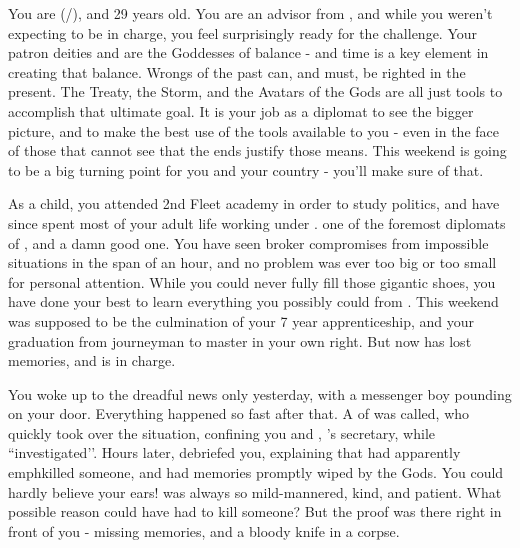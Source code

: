 \documentclass[char]{GL2020}
\begin{document}
\name{\cJuniorStatesman{}}

You are \cJuniorStatesman{\full} (\cJuniorStatesman{\they}/\cJuniorStatesman{\them}), and 29 years old. You are an advisor from \pShip{}, and while you weren’t expecting to be in charge, you feel surprisingly ready for the challenge. Your patron deities \cEbb{} and \cFlow{} are the Goddesses of balance - and time is a key element in creating that balance. Wrongs of the past can, and must, be righted in the present. The Treaty, the Storm, and the Avatars of the Gods are all just tools to accomplish that ultimate goal. It is your job as a diplomat to see the bigger picture, and to make the best use of the tools available to you - even in the face of those that cannot see that the ends justify those means. This weekend is going to be a big turning point for you and your country - you’ll make sure of that.

As a child, you attended 2nd Fleet academy in order to study politics, and have since spent most of your adult life working under \cHeadDiplomat{}. \cHeadDiplomat{\Theyare} one of the foremost diplomats of \pShip{}, and a damn good one. You have seen \cHeadDiplomat{\them} broker compromises from impossible situations in the span of an hour, and no problem was ever too big or too small for \cHeadDiplomat{\their} personal attention. While you could never fully fill those gigantic shoes, you have done your best to learn everything you possibly could from \cHeadDiplomat{\them}. This weekend was supposed to  be the culmination of your 7 year apprenticeship, and your graduation from journeyman to master in your own right. But now \cHeadDiplomat{} has lost  memories, and \cEbbPriest{} is in charge. 

You woke up to the dreadful news only yesterday, with a messenger boy pounding on your door. Everything happened so fast after that. A \cEbbPriest{\cleric} of \cEbb{} was called, who quickly took over the situation, confining you and \cChupLeader{}, \cHeadDiplomat{}’s secretary, while \cEbbPriest{\they} ``investigated’’. Hours later, \cEbbPriest{} debriefed you, explaining that \cHeadDiplomat{} had apparently emph{killed someone}, and had \cHeadDiplomat{\their} memories promptly wiped by the Gods. You could hardly believe your ears! \cHeadDiplomat{} was always so mild-mannered, kind, and patient. What possible reason could \cHeadDiplomat{\they} have had to kill someone? But the proof was there right in front of you - missing memories, and a bloody knife in a corpse.
\end{document}
